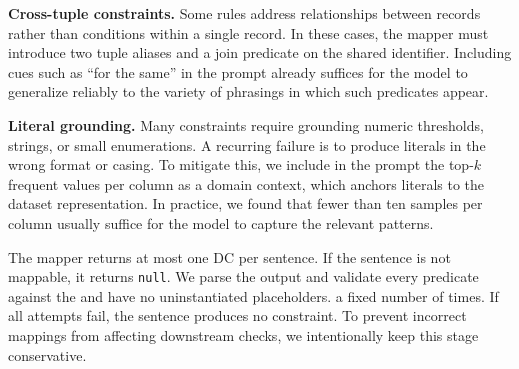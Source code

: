 \smallskip\noindent\textbf{Cross-tuple constraints.}
Some rules address relationships between records rather than conditions 
within a single record. In these cases, the mapper must introduce two 
tuple aliases and a join predicate on the shared identifier.%
Including cues such as ``for the same'' in the prompt
already suffices for the model to generalize reliably to the variety of phrasings in which such predicates appear.


\smallskip\noindent\textbf{Literal grounding.}
Many constraints require grounding numeric thresholds, strings, or small 
enumerations. A recurring failure is to produce literals in the wrong 
format or casing. To mitigate this, we include in the prompt the top-$k$ 
frequent values per column as a domain context, which anchors 
literals to the dataset representation. In practice, we found that fewer than ten 
samples per column usually suffice for the model to capture the relevant patterns.

The mapper returns at most one DC per sentence. If the sentence is not mappable, it returns \texttt{null}. We parse the output and validate every predicate against the \DIFdelbegin {}\DIFdelend \DIFaddbegin {}\DIFaddend and have no uninstantiated placeholders. \DIFdelbegin {}\DIFdelend \DIFaddbegin {}\DIFaddend a fixed number of times\DIFaddbegin {}\DIFaddend . If all attempts fail, the sentence produces no constraint. To prevent incorrect mappings from affecting downstream checks, we intentionally keep this stage conservative.


